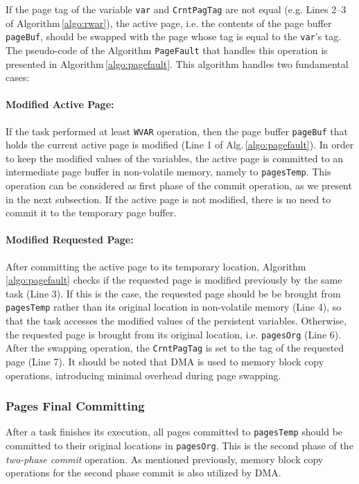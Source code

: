 If the page tag of the variable \texttt{var} and \texttt{CrntPagTag} are not equal (e.g. Lines 2--3 of Algorithm\,\ref{algo:rwar}), the active page, i.e. the contents of the page buffer \texttt{pageBuf}, should be swapped with the page whose tag is equal to the \texttt{var}'s tag. The pseudo-code of the Algorithm \texttt{PageFault} that handles this operation is presented in Algorithm\,\ref{algo:pagefault}. This algorithm handles two fundamental cases:

\paragraph{Modified Active Page:} If the task performed at least \texttt{WVAR} operation, then the page buffer \texttt{pageBuf} that holds the current active page is modified (Line 1 of Alg.\,\ref{algo:pagefault}). In order to keep the modified values of the variables, the active page is committed to an intermediate page buffer in non-volatile memory, namely to \texttt{pagesTemp}. This operation can be considered as first phase of the commit operation, as we present in the next subsection. If the active page is not modified, there is no need to commit it to the temporary page buffer.

\paragraph{Modified Requested Page:} After committing the active page to its temporary location, Algorithm\,\ref{algo:pagefault} checks if the requested page is modified previously by the same task (Line 3). If this is the case, the requested page should be be brought from \texttt{pagesTemp} rather than its original location in non-volatile memory (Line 4), so that the task accesses the modified values of the persistent variables. Otherwise, the requested page is brought from its original location, i.e. \texttt{pagesOrg} (Line 6). After the swapping operation, the \texttt{CrntPagTag} is set to the tag of the requested page (Line 7). It should be noted that DMA is used to memory block copy operations, introducing minimal overhead during page swapping. 

\subsubsection{Pages Final Committing}

After a task finishes its execution, all pages committed to \texttt{pagesTemp} should be committed to their original locations in \texttt{pagesOrg}. This is the second phase of the \emph{two-phase commit} operation. As mentioned previously, memory block copy operations for the second phase commit is also utilized by DMA.

